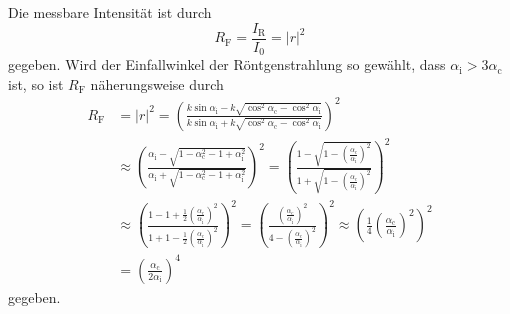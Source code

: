 \documentclass[captions=tableheading]{scrartcl}
\newcommand{\indx}[1]{\text{#1}}
\begin{document}
Die messbare Intensität ist durch
\begin{equation}
R_{\indx{F}  }=\frac{I_{\indx{R}}}{I_{\indx{0}}}= \left\vert r \right\vert^2
\end{equation}
gegeben.
Wird der Einfallwinkel der Röntgenstrahlung so gewählt, dass $\alpha_{\indx{i}}>3\alpha_{\indx{c}}$ ist, so ist $R_{\indx{F}  }$ näherungsweise durch
\begin{align}
R_{\indx{F}}&=\left\vert r \right\vert^2=\left( \frac{k\sin \alpha_{\indx{i}}  - k\sqrt{ \cos^2 \alpha_{\indx{c}} - \cos^2 \alpha_{\indx{i}} }}{k\sin \alpha_{\indx{i}}  + k\sqrt{ \cos^2 \alpha_{\indx{c}} - \cos^2 \alpha_{\indx{i}} }}  \right)^2\\
&\approx \left( \frac{\alpha_{\indx{i}}-\sqrt{1-\alpha_{\indx{c}}^2 -1 + \alpha_{\indx{i}}^2} }{\alpha_{\indx{i}}+\sqrt{1-\alpha_{\indx{c}}^2 -1 + \alpha_{\indx{i}}^2}}  \right)^2=\left( \frac{1-\sqrt{ 1 -\left(\frac{\alpha_{\indx{c}} }{\alpha_{\indx{i}}}\right)^2}  }{1+\sqrt{ 1 -\left(\frac{\alpha_{\indx{c}} }{\alpha_{\indx{i}}}\right)^2} }  \right)^2\\
&\approx \left( \frac{1-1+\frac{1}{2}\left(\frac{\alpha_{\indx{c}} }{\alpha_{\indx{i}}}\right)^2 }{1+1-\frac{1}{2}\left(\frac{\alpha_{\indx{c}} }{\alpha_{\indx{i}}}\right)^2}  \right)^2= \left(\frac{\left(\frac{\alpha_{\indx{c}} }{\alpha_{\indx{i}}}\right)^2}{4-\left(\frac{\alpha_{\indx{c}} }{\alpha_{\indx{i}}}\right)^2} \right)^2\approx \left(\frac{1}{4}\left(\frac{\alpha_{\indx{c}} }{\alpha_{\indx{i}}}\right)^2   \right)^2\\
&= \left(\frac{\alpha_{\indx{c}} }{2\alpha_{\indx{i}}}\right)^4
\end{align}
gegeben.
\end{document}
